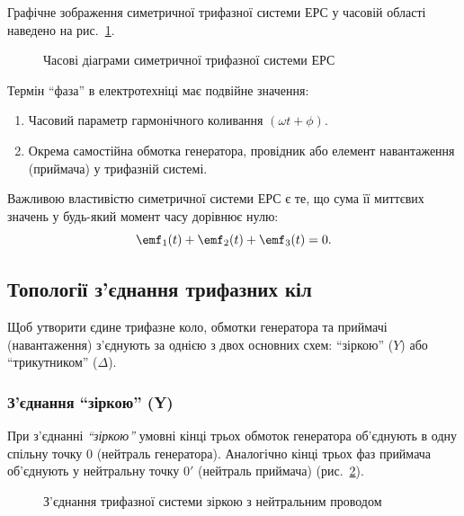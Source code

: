 Графічне зображення симетричної трифазної системи ЕРС у часовій області наведено на рис.~\ref{pic:ThreePhaseWaveforms}.

\begin{figure}[h!]
	\centering
	\caption{Часові діаграми симетричної трифазної системи ЕРС}
	\label{pic:ThreePhaseWaveforms}
\end{figure}

Термін \enquote{фаза} в електротехніці має подвійне значення:
\begin{enumerate}
    \item Часовий параметр гармонічного коливання $(\omega t + \phi)$.
    \item Окрема самостійна обмотка генератора, провідник або елемент навантаження (приймача) у трифазній системі.
\end{enumerate}

Важливою властивістю симетричної системи ЕРС є те, що сума її миттєвих значень у будь-який момент часу дорівнює нулю:
\begin{equation}
	\emf_1(t) + \emf_2(t) + \emf_3(t) = 0.
\end{equation}

\subsection*{Топології з'єднання трифазних кіл}

Щоб утворити єдине трифазне коло, обмотки генератора та приймачі (навантаження) з'єднують за однією з двох основних схем: \enquote{зіркою} ($Y$) або \enquote{трикутником} ($\Delta$).

\subsubsection*{З'єднання \enquote{зіркою} (Y)}

При з'єднанні \emph{\enquote{зіркою}} умовні кінці трьох обмоток генератора об'єднують в одну спільну точку $0$ (нейтраль генератора). Аналогічно кінці трьох фаз приймача об'єднують у нейтральну точку $0'$ (нейтраль приймача) (рис.~\ref{pic:ThreePhaseStar}).

\begin{figure}[h!]
	\centering
	\caption{З'єднання трифазної системи зіркою з нейтральним проводом}
	\label{pic:ThreePhaseStar}
\end{figure}


